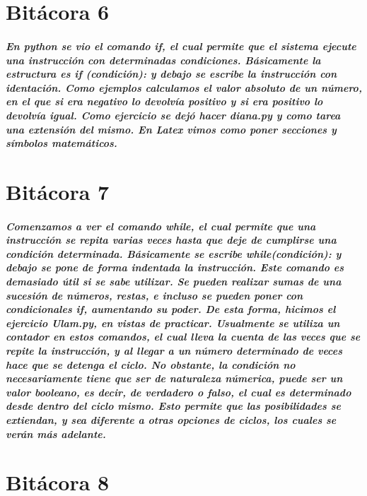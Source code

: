 \documentclass{book}
\begin{document}
	\chapter{Bitácora 6}
	\paragraph{En python se vio el comando if, el cual permite que el sistema ejecute una instrucción con determinadas condiciones. Básicamente la estructura es if (condición): y debajo se escribe la instrucción con identación. Como ejemplos calculamos el valor absoluto de un número, en el que si era negativo lo devolvía positivo y si era positivo lo devolvía igual. Como ejercicio se dejó hacer diana.py y como tarea una extensión del mismo. En Latex vimos como poner secciones y símbolos matemáticos.}
	\chapter{Bitácora 7}
	\paragraph{Comenzamos a ver el comando while, el cual permite que una instrucción se repita varias veces hasta que deje de cumplirse una condición determinada. Básicamente se escribe while(condición): y debajo se pone de forma indentada la instrucción. Este comando es demasiado útil si se sabe utilizar. Se pueden realizar sumas de una sucesión de números, restas, e incluso se pueden poner con condicionales if, aumentando su poder. De esta forma, hicimos el ejercicio Ulam.py, en vistas de practicar. Usualmente se utiliza un contador en estos comandos, el cual lleva la cuenta de las veces que se repite la instrucción, y al llegar a un número determinado de veces hace que se detenga el ciclo. No obstante, la condición no necesariamente tiene que ser de naturaleza númerica, puede ser un valor booleano, es decir, de verdadero o falso, el cual es determinado desde dentro del ciclo mismo. Esto permite que las posibilidades se extiendan, y sea diferente a otras opciones de ciclos, los cuales se verán más adelante.}
	\chapter{Bitácora 8}
\end{document}
